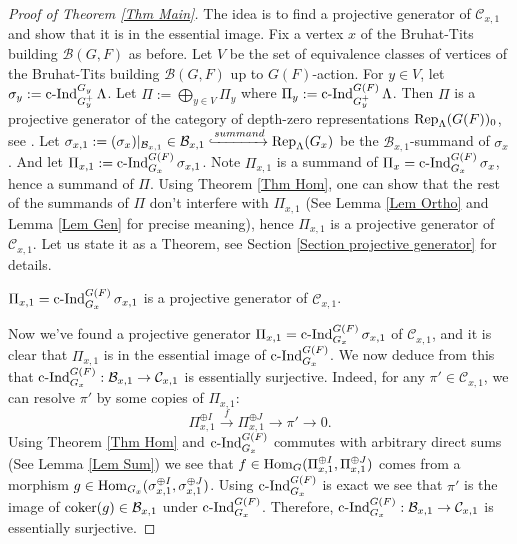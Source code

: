 \begin{proof}[Proof of Theorem \ref{Thm Main}]
			The idea is to find a projective generator of $\mathcal{C}_{x,1}$ and show that it is in the essential image. Fix a vertex $x$ of the Bruhat-Tits building $\mathcal{B}(G, F)$ as before. Let $V$ be the set of equivalence classes of vertices of the Bruhat-Tits building $\mathcal{B}(G, F)$ up to $G(F)$-action. For $y \in V$, let $\sigma_y:=\operatorname{\operatorname{c-Ind}}_{G_y^+}^{G_y}\Lambda$. Let $\Pi:=\bigoplus_{y \in V}\Pi_y$ where $\Pi_y:=\operatorname{\operatorname{c-Ind}}_{G_y^+}^{G(F)}\Lambda$. Then $\Pi$ is a projective generator of the category of depth-zero representations $\operatorname{\operatorname{Rep}}_{\Lambda}(G(F))_0$, see \cite[Appendix]{dat2009finitude}. Let $\sigma_{x,1}:=(\sigma_x)|_{\mathcal{B}_{x,1}} \in \mathcal{B}_{x,1} \xhookrightarrow{summand} \operatorname{\operatorname{Rep}}_{\Lambda}(G_x)$ be the $\mathcal{B}_{x,1}$-summand of $\sigma_x$. And let $\Pi_{x,1}:=\operatorname{\operatorname{c-Ind}}_{G_x}^{G(F)}\sigma_{x,1}$. Note $\Pi_{x,1}$ is a summand of $\Pi_x=\operatorname{\operatorname{c-Ind}}_{G_x}^{G(F)}\sigma_x$, hence a summand of $\Pi$. Using Theorem \ref{Thm Hom}, one can show that the rest of the summands of $\Pi$ don't interfere with $\Pi_{x,1}$ (See Lemma \ref{Lem Ortho} and Lemma \ref{Lem Gen} for precise meaning), hence $\Pi_{x,1}$ is a projective generator of $\mathcal{C}_{x,1}$. Let us state it as a Theorem, see Section \ref{Section projective generator} for details.
			
			\begin{theorem}\label{Thm Proj}
				$\Pi_{x,1}=\operatorname{\operatorname{c-Ind}}_{G_x}^{G(F)}\sigma_{x,1}$ is a projective generator of $\mathcal{C}_{x,1}$.
			\end{theorem}
			
			Now we've found a projective generator $\Pi_{x,1}=\operatorname{\operatorname{c-Ind}}_{G_x}^{G(F)}\sigma_{x,1}$ of $\mathcal{C}_{x,1}$, and it is clear that $\Pi_{x,1}$ is in the essential image of $\operatorname{\operatorname{c-Ind}}_{G_x}^{G(F)}$. We now deduce from this that $\operatorname{\operatorname{c-Ind}}_{G_x}^{G(F)}: \mathcal{B}_{x,1} \to \mathcal{C}_{x,1}$ is essentially surjective. Indeed, for any $\pi' \in \mathcal{C}_{x,1}$, we can resolve $\pi'$ by some copies of $\Pi_{x,1}$:
			$$\Pi_{x,1}^{\oplus I} \xrightarrow{f} \Pi_{x,1}^{\oplus J} \to \pi' \to 0.$$
			Using Theorem \ref{Thm Hom} and $\operatorname{\operatorname{c-Ind}}_{G_x}^{G(F)}$ commutes with arbitrary direct sums (See Lemma \ref{Lem Sum}) we see that $f \in \operatorname{\operatorname{Hom}}_G(\Pi_{x,1}^{\oplus I}, \Pi_{x,1}^{\oplus J})$ comes from a morphism $g \in \operatorname{\operatorname{Hom}}_{G_x}(\sigma_{x,1}^{\oplus I}, \sigma_{x,1}^{\oplus J})$. Using $\operatorname{\operatorname{c-Ind}}_{G_x}^{G(F)}$ is exact we see that $\pi'$ is the image of $\operatorname{coker}(g) \in \mathcal{B}_{x,1}$ under $\operatorname{\operatorname{c-Ind}}_{G_x}^{G(F)}$. Therefore, $\operatorname{\operatorname{c-Ind}}_{G_x}^{G(F)}: \mathcal{B}_{x,1} \to \mathcal{C}_{x,1}$ is essentially surjective.
			
		\end{proof}
		
